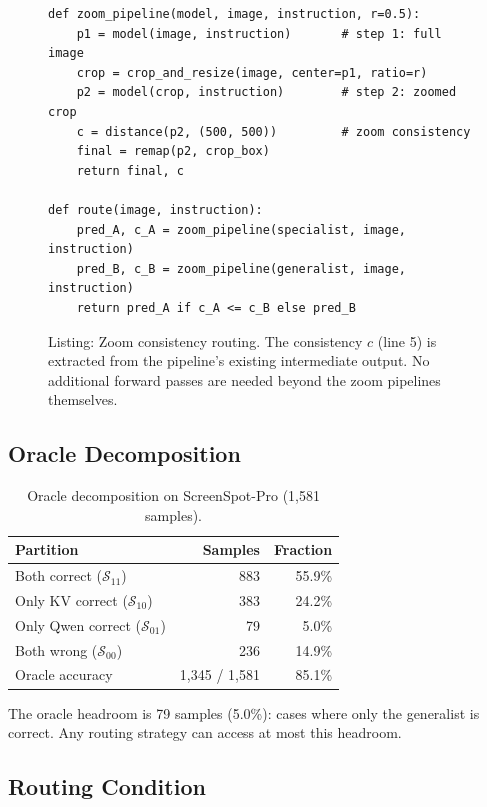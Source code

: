 \documentclass{article}
\begin{document}
\begin{figure}[h]
\begin{lstlisting}
def zoom_pipeline(model, image, instruction, r=0.5):
    p1 = model(image, instruction)       # step 1: full image
    crop = crop_and_resize(image, center=p1, ratio=r)
    p2 = model(crop, instruction)        # step 2: zoomed crop
    c = distance(p2, (500, 500))         # zoom consistency
    final = remap(p2, crop_box)
    return final, c

def route(image, instruction):
    pred_A, c_A = zoom_pipeline(specialist, image, instruction)
    pred_B, c_B = zoom_pipeline(generalist, image, instruction)
    return pred_A if c_A <= c_B else pred_B
\end{lstlisting}
\caption{Listing: Zoom consistency routing. The consistency $c$ (line 5) is extracted from the pipeline's existing intermediate output. No additional forward passes are needed beyond the zoom pipelines themselves.}
\label{fig:pseudocode}
\end{figure}

\subsection{Oracle Decomposition}

\begin{table}[h]
\centering
\caption{Oracle decomposition on ScreenSpot-Pro (1,581 samples).}
\label{tab:oracle}
\begin{tabular}{lrr}
\toprule
\textbf{Partition} & \textbf{Samples} & \textbf{Fraction} \\
\midrule
Both correct ($\mathcal{S}_{11}$) & 883 & 55.9\% \\
Only KV correct ($\mathcal{S}_{10}$) & 383 & 24.2\% \\
Only Qwen correct ($\mathcal{S}_{01}$) & 79 & 5.0\% \\
Both wrong ($\mathcal{S}_{00}$) & 236 & 14.9\% \\
\midrule
Oracle accuracy & 1,345 / 1,581 & 85.1\% \\
\bottomrule
\end{tabular}
\end{table}

The oracle headroom is 79 samples (5.0\%): cases where only the generalist is correct. Any routing strategy can access at most this headroom.

\subsection{Routing Condition}
\end{document}
